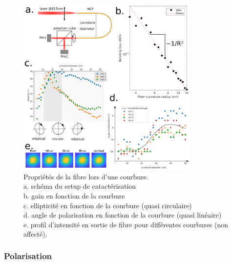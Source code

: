
\begin{figure}
\centering
\includegraphics[width=0.8\textwidth]{./files/fiber_bending.svg.png}
\caption{Propriétés de la fibre lors d'une courbure.
\\ a. schéma du setup de catactérisation
\\ b. gain en fonction de la courbure
\\ c. ellipticité en fonction de la courbure (quasi circulaire)
\\ d. angle de polarisation en fonction de la courbure (quasi linéaire)
\\ e. profil d'intensité en sortie de fibre pour différentes courbures (non affecté).
\label{FIGfibercarac}}
\end{figure}



\subsubsection{Polarisation}

